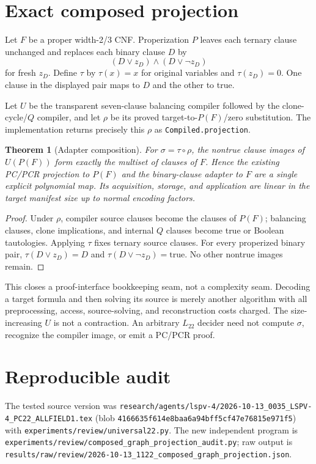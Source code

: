 \documentclass[11pt]{article}
\newtheorem{theorem}{Theorem}
\begin{document}
\section{Exact composed projection}
Let $F$ be a proper width-2/3 CNF.  Properization $P$ leaves each ternary clause
unchanged and replaces each binary clause $D$ by
\[
(D\lor z_D)\land(D\lor\neg z_D)
\]
for fresh $z_D$.  Define $\tau$ by $\tau(x)=x$ for original variables and
$\tau(z_D)=0$.  One clause in the displayed pair maps to $D$ and the other to
true.

Let $U$ be the transparent seven-clause balancing compiler followed by the
clone-cycle/$Q$ compiler, and let $\rho$ be its proved target-to-$P(F)$/zero
substitution.  The implementation returns precisely this $\rho$ as
\texttt{Compiled.projection}.

\begin{theorem}[Adapter composition]
For $\sigma=\tau\circ\rho$, the nontrue clause images of $U(P(F))$ form exactly
the multiset of clauses of $F$.  Hence the existing PC/PCR projection to
$P(F)$ and the binary-clause adapter to $F$ are a single explicit polynomial
map.  Its acquisition, storage, and application are linear in the target
manifest size up to normal encoding factors.
\end{theorem}
\begin{proof}
Under $\rho$, compiler source clauses become the clauses of $P(F)$; balancing
clauses, clone implications, and internal $Q$ clauses become true or Boolean
tautologies.  Applying $\tau$ fixes ternary source clauses.  For every
properized binary pair, $\tau(D\lor z_D)=D$ and
$\tau(D\lor\neg z_D)=\mathrm{true}$.  No other nontrue images remain.
\end{proof}

This closes a proof-interface bookkeeping seam, not a complexity seam.
Decoding a target formula and then solving its source is merely another
algorithm with all preprocessing, access, source-solving, and reconstruction
costs charged.  The size-increasing $U$ is not a contraction.  An arbitrary
$L_{22}$ decider need not compute $\sigma$, recognize the compiler image, or
emit a PC/PCR proof.

\section{Reproducible audit}
The tested source version was
\texttt{research/agents/lspv-4/2026-10-13\_0035\_LSPV-4\_PC22\_ALLFIELD1.tex}
(blob \texttt{4166635f614e8baa6a94bff5cf47e76815e971f5}) with
\texttt{experiments/review/universal22.py}.  The new independent program is
\texttt{experiments/review/composed\_graph\_projection\_audit.py}; raw output is
\texttt{results/raw/review/2026-10-13\_1122\_composed\_graph\_projection.json}.
\end{document}
